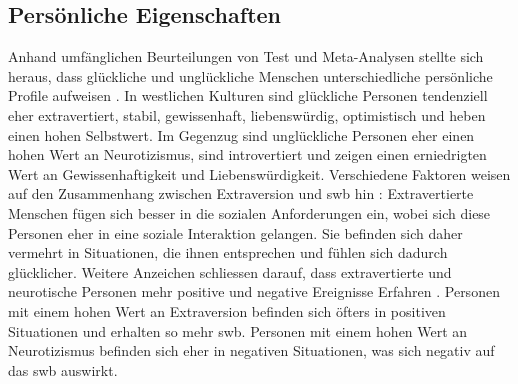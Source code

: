 \subsection{Persönliche Eigenschaften}\label{subsec.swbPersTraits}
Anhand umfänglichen Beurteilungen von Test und Meta-Analysen stellte sich heraus, dass glückliche und unglückliche Menschen unterschiedliche persönliche Profile aufweisen \cite{Diener:1999, Steel:2008}. In westlichen Kulturen sind glückliche Personen tendenziell eher extravertiert, stabil, gewissenhaft, liebenswürdig, optimistisch und heben einen hohen Selbstwert. Im Gegenzug sind unglückliche Personen eher einen hohen Wert an Neurotizismus, sind introvertiert und zeigen einen erniedrigten Wert an Gewissenhaftigkeit und Liebenswürdigkeit. \newline
Verschiedene Faktoren weisen auf den Zusammenhang zwischen Extraversion und \gls{swb} hin \cite{Diener:1999}: Extravertierte Menschen fügen sich besser in die sozialen Anforderungen ein, wobei sich diese Personen eher in eine soziale Interaktion gelangen. Sie befinden sich daher vermehrt in Situationen, die ihnen entsprechen und fühlen sich dadurch glücklicher. Weitere Anzeichen schliessen darauf, dass extravertierte und neurotische Personen mehr positive und negative Ereignisse Erfahren \cite{Carr:2011}. Personen mit einem hohen Wert an Extraversion befinden sich öfters in positiven Situationen und erhalten so mehr \gls{swb}. Personen mit einem hohen Wert an Neurotizismus befinden sich eher in negativen Situationen, was sich negativ auf das \gls{swb} auswirkt.	


